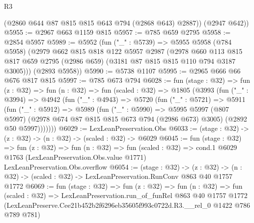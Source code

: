 \begin{lexlean}{R3}
\begin{coremodule}
        (@2860 @644 @87 @815 @815 @643 @794 (@2868 @643) @2887))
      (@2947 @642))
@5955 := @2967 @663 @1159 @815
@5957 := @785 @659 @2795
@5958 := @2854 @5957
@5989 := @5952
    (fun ("_" : @5739) =>
    @5955
      @5958
      (@784 @5958)
      (@2979
        @662
        @815
        @818
        @122
        @5957
        @2987
        (@2978
          @660
          @113
          @815
          @817
          @659
          @2795
          (@2986 @659)
          (@3181 @87 @815 @815 @110 @794 @3187 @3005)))
      (@2893 @5958))
@5990 := @5738 @1107
@5995 := @2965 @666 @66 @676 @817 @815
@5997 := @785 @673 @794
@6028 := fun (stage : @32) =>
  fun (z : @32) =>
  fun (n : @32) =>
  fun (scaled : @32) =>
  @1805
    (@3993
      (fun ("_" : @3994) =>
      @4942
        (fun ("_" : @4943) =>
        @5720
          (fun ("_" : @5721) =>
          @5911
            (fun ("_" : @5912) =>
            @5989
              (fun ("_" : @5990) =>
              @5995
                @5997
                (@807 @5997)
                (@2978 @674 @87 @815 @815 @673 @794 (@2986 @673) @3005)
                (@2892 @50 @5997)))))))
@6029 := LexLeanPreservation.Obs
@6033 := (stage : @32) -> (z : @32) -> (n : @32) -> (scaled : @32) -> @6029
@6045 := fun (stage : @32) =>
  fun (z : @32) =>
  fun (n : @32) =>
  fun (scaled : @32) =>
  cond.{1} @6029 @1763 (LexLeanPreservation.Obs.value @1771) LexLeanPreservation.Obs.overflow
@6054 := (stage : @32) ->
  (z : @32) -> (n : @32) -> (scaled : @32) -> LexLeanPreservation.RunConv @863 @40 @1757 @1772
@6069 := fun (stage : @32) =>
  fun (z : @32) =>
  fun (n : @32) =>
  fun (scaled : @32) =>
  LexLeanPreservation.run_of_funRel
    @863
    @40
    @1757
    @1772
    (LexLeanPreserve.Cee21b452b2f6296eb35605f993c0722d.R3.__rel_0 @1422 @786 @789 @781)
\end{coremodule}
\end{lexlean}
